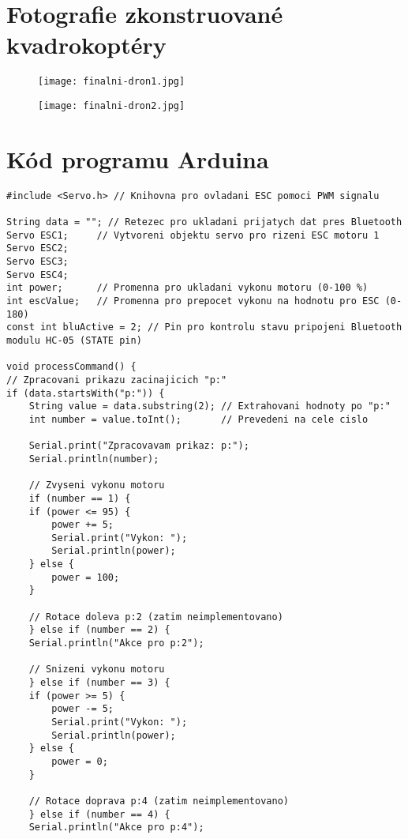 \documentclass[12pt]{report}
\begin{document}
\begin{appendices}
\chapter[Fotografie zkonstruované kvadrokoptéry]{Fotografie zkonstruované kvadrokoptéry}	
\begin{figure}[H]
	\centering
	\texttt{[image: finalni-dron1.jpg]}
\end{figure}
\begin{figure}[H]
	\centering
	\texttt{[image: finalni-dron2.jpg]}
\end{figure}
\chapter[Kód programu Arduina]{Kód programu Arduina}
\begin{lstlisting}[title={}, caption={}, label={}, basicstyle=\footnotesize\ttfamily, inputencoding=utf8]
#include <Servo.h> // Knihovna pro ovladani ESC pomoci PWM signalu

String data = ""; // Retezec pro ukladani prijatych dat pres Bluetooth
Servo ESC1;     // Vytvoreni objektu servo pro rizeni ESC motoru 1
Servo ESC2;
Servo ESC3;
Servo ESC4;
int power;      // Promenna pro ukladani vykonu motoru (0-100 %)
int escValue;   // Promenna pro prepocet vykonu na hodnotu pro ESC (0-180)
const int bluActive = 2; // Pin pro kontrolu stavu pripojeni Bluetooth modulu HC-05 (STATE pin)

void processCommand() {
// Zpracovani prikazu zacinajicich "p:"
if (data.startsWith("p:")) {
	String value = data.substring(2); // Extrahovani hodnoty po "p:"
	int number = value.toInt();       // Prevedeni na cele cislo

	Serial.print("Zpracovavam prikaz: p:");
	Serial.println(number);

	// Zvyseni vykonu motoru
	if (number == 1) {
	if (power <= 95) {
		power += 5;
		Serial.print("Vykon: ");
		Serial.println(power);
	} else {
		power = 100;
	}

	// Rotace doleva p:2 (zatim neimplementovano)
	} else if (number == 2) {
	Serial.println("Akce pro p:2");

	// Snizeni vykonu motoru
	} else if (number == 3) {
	if (power >= 5) {
		power -= 5;
		Serial.print("Vykon: ");
		Serial.println(power);
	} else {
		power = 0;
	}

	// Rotace doprava p:4 (zatim neimplementovano)
	} else if (number == 4) {
	Serial.println("Akce pro p:4");


\end{lstlisting}
\end{appendices}
\end{document}
